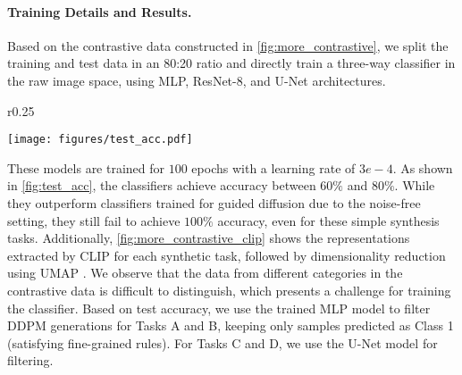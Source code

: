 \paragraph{Training Details and Results.}Based on the contrastive data constructed in \cref{fig:more_contrastive}, we split the training and test data in an 80:20 ratio and directly train a three-way classifier in the raw image space, using MLP, ResNet-8, and U-Net architectures. 
\begin{wrapfigure}{r}{0.25\textwidth}
\begin{center}
    \texttt{[image: figures/test\_acc.pdf]}
\end{center}
\vspace{-0.2in}
\caption{Test accuracy of different model architectures on contrastive datasets.} 
\vspace{-0.5in}
\label{fig:test_acc} 
\end{wrapfigure}
These models are trained for $100$ epochs with a learning rate of $3e-4$. As shown in \cref{fig:test_acc}, the classifiers achieve accuracy between $60\%$ and $80\%$. While they outperform classifiers trained for guided diffusion due to the noise-free setting, they still fail to achieve $100\%$ accuracy, even for these simple synthesis tasks. Additionally, \cref{fig:more_contrastive_clip} shows the representations extracted by CLIP \cite{radford2021learning} for each synthetic task, followed by dimensionality reduction using UMAP \cite{mcinnes2018umap}. We observe that the data from different categories in the contrastive data is difficult to distinguish, which presents a challenge for training the classifier. Based on test accuracy, we use the trained MLP model to filter DDPM generations for Tasks A and B, keeping only samples predicted as Class 1 (satisfying fine-grained rules). For Tasks C and D, we use the U-Net model for filtering.


